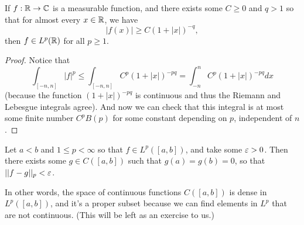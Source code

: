 \begin{corollary}
If $f: \mathbb R \to \mathbb C$ is a measurable function, and there exists some $C \ge 0$ and $q > 1$ so that for almost every $x \in \mathbb R$, we have
\[
    |f(x)| \ge C(1 + |x|)^{-q},
\]
then $f \in L^p(\mathbb R)$ for all $p \ge 1$.
\end{corollary}
\begin{proof}
Notice that 
\[
    \int_{[-n, n]} |f|^p \le \int_{[-n, n]} C^p(1 + |x|)^{-pq} = \int_{-n}^n C^p(1 + |x|)^{-pq} dx 
\]
(because the function $(1+|x|)^{-pq}$ is continuous and thus the Riemann and Lebesgue integrals agree). And now we can check that this integral is at most some finite number $C^pB(p)$ for some constant depending on $p$, independent of $n$.
\end{proof}

\begin{proposition}
Let $a < b$ and $1 \le p < \infty$ so that $f \in L^p([a, b])$, and take some $\varepsilon > 0$. Then there exists some $g \in C([a, b])$ such that $g(a) = g(b) = 0$, so that $||f-g||_p < \varepsilon$.
\end{proposition}

In other words, the space of continuous functions $C([a, b])$ is dense in $L^p([a, b])$, and it's a proper subset because we can find elements in $L^p$ that are not continuous. (This will be left as an exercise to us.)

